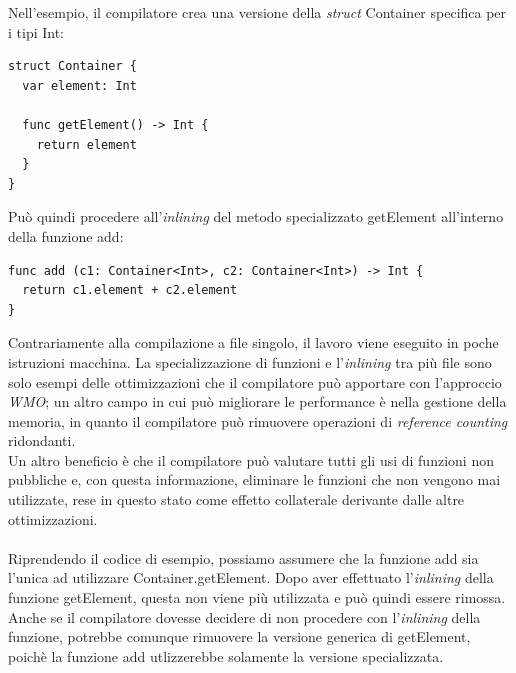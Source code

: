 Nell'esempio, il compilatore crea una versione della \textit{struct} Container specifica per i tipi Int: 
\begin{lstlisting}
struct Container {
  var element: Int

  func getElement() -> Int {
    return element
  }
}
\end{lstlisting}
Può quindi procedere all'\textit{inlining} del metodo specializzato getElement all'interno della funzione add:
\begin{lstlisting}
func add (c1: Container<Int>, c2: Container<Int>) -> Int {
  return c1.element + c2.element
}
\end{lstlisting}
Contrariamente alla compilazione a file singolo, il lavoro viene eseguito in poche istruzioni macchina. La specializzazione di funzioni e l'\textit{inlining} tra più file sono solo esempi delle ottimizzazioni che il compilatore può apportare con l'approccio \textit{WMO}; un altro campo in cui può migliorare le performance è nella gestione della memoria, in quanto il compilatore può rimuovere operazioni di \textit{reference counting} ridondanti.\\
Un altro beneficio è che il compilatore può valutare tutti gli usi di funzioni non pubbliche e, con questa informazione, eliminare le funzioni che non vengono mai utilizzate, rese in questo stato come effetto collaterale derivante dalle altre ottimizzazioni.\\\\Riprendendo il codice di esempio, possiamo assumere che la funzione add sia l'unica ad utilizzare Container.getElement. Dopo aver effettuato l'\textit{inlining} della funzione getElement, questa non viene più utilizzata e può quindi essere rimossa. Anche se il compilatore dovesse decidere di non procedere con l'\textit{inlining} della funzione, potrebbe comunque rimuovere la versione generica di getElement, poichè la funzione add utlizzerebbe solamente la versione specializzata.
